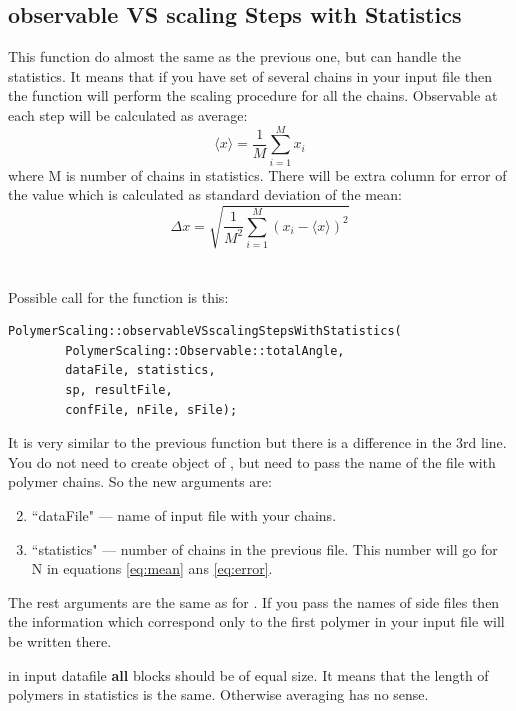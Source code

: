 \documentclass[12pt]{article}
\begin{document}
\begin{mySection}
\subsection{observable VS scaling Steps with Statistics}\label{sec:observableVSscalingStepWithStatistics}
This function do almost the same as the previous one, but can handle the statistics. It means that if you have set of several chains in your input file then the function will perform the scaling procedure for all the chains. Observable at each step will be calculated as average:
\begin{equation}
\langle x\rangle = \frac{1}{M} \sum_{i=1}^M x_i
\label{eq:mean}
\end{equation}
where M is number of chains in statistics. There will be extra column for error of the value which is calculated as standard deviation of the mean:
\begin{equation}
\Delta x = \sqrt{\frac{1}{M^2}\sum_{i=1}^M \left(x_i - \langle x\rangle\right)^2}
\label{eq:error}
\end{equation}
\\
\\
Possible call for the function is this:
\begin{lstlisting}
PolymerScaling::observableVSscalingStepsWithStatistics(
		PolymerScaling::Observable::totalAngle, 
		dataFile, statistics,
		sp, resultFile,
		confFile, nFile, sFile);
\end{lstlisting}
It is very similar to the previous function but there is a difference in the 3rd line. You do not need to create object of , but need to pass the name of the file with polymer chains.
So the new arguments are:
\begin{enumerate}
\setcounter{enumi}{1}
\item ``dataFile" --- name of input file with your chains.
\item ``statistics" --- number of chains in the previous file. This number will go for N in equations \ref{eq:mean} ans \ref{eq:error}.
\end{enumerate}
The rest arguments are the same as for . If you pass the names of side files then the information which correspond only to the first polymer in your input file will be written there.

\important in input datafile \textbf{all} blocks should be of equal size. It means that the length of polymers in statistics is the same. Otherwise averaging has no sense.


\end{mySection}
\end{document}
